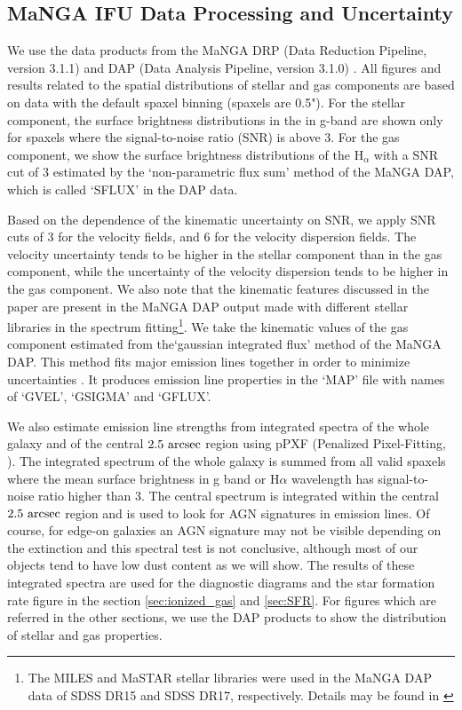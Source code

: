 \documentclass[fleqn,usenatbib]{mnras}
\begin{document}
\subsection{MaNGA IFU Data Processing and Uncertainty} \label{sec:manga}

We use the data products from the MaNGA DRP 
(Data Reduction Pipeline, version 3.1.1) 
and DAP (Data Analysis Pipeline, version 3.1.0) \citep{DRP,DAP1,DAP2,DAP3}.
All figures and results related to the spatial distributions of stellar and gas components
are based on data with the default spaxel binning 
(spaxels are 0.5").
For the stellar component, the surface brightness distributions in the in g-band
are shown only for spaxels where the signal-to-noise ratio (SNR) is above 3.
For the gas component, 
we show the surface brightness distributions of the H$_\alpha$ with a SNR cut of 3
estimated by the `non-parametric flux sum' method 
of the MaNGA DAP, which is called `SFLUX' in the DAP data.


Based on the dependence of the kinematic uncertainty on SNR, 
we apply SNR cuts of 3 for the velocity fields, 
and 6 for the velocity dispersion fields.
The velocity uncertainty tends to be higher in the stellar component than in the gas component,
while the uncertainty of the velocity dispersion tends to be higher in the gas component. 
We also note that the kinematic features discussed in the paper 
are present in the MaNGA DAP output made with different stellar libraries in the spectrum fitting\footnote{The MILES and MaSTAR stellar libraries were used in the MaNGA DAP data of SDSS DR15 and SDSS DR17, respectively. Details may be found in \citet{DAP1,DAP3}}.
We take the kinematic values of the gas component
estimated from the`gaussian integrated flux' method of the MaNGA DAP. 
This method fits major emission lines together 
in order to minimize uncertainties \citet{DAP1,DAP2}.
It produces emission line properties in the `MAP' file 
with names of `GVEL', `GSIGMA' and `GFLUX'. 


We also estimate emission line strengths from integrated spectra 
of the whole galaxy and of the central $\rm 2.5~arcsec$ region using pPXF 
(Penalized Pixel-Fitting, \citet{pPXF}). 
The integrated spectrum of the whole galaxy is summed from all valid spaxels 
where the mean surface brightness in g band or H$\alpha$ wavelength 
has signal-to-noise ratio higher than $3$.
The central spectrum is integrated within the central $\rm 2.5~arcsec$ region 
and is used to look for AGN signatures in emission lines. Of course, for edge-on galaxies an AGN signature may not be visible depending on the extinction and this spectral test is not conclusive, although most of our objects tend to have low dust content as we will show.
The results of these integrated spectra are used for the diagnostic diagrams and the star formation rate figure
in the section \ref{sec:ionized_gas} and \ref{sec:SFR}.
For figures which are referred in the other sections, 
we use the DAP products to show the distribution of 
stellar and gas properties.
\end{document}
